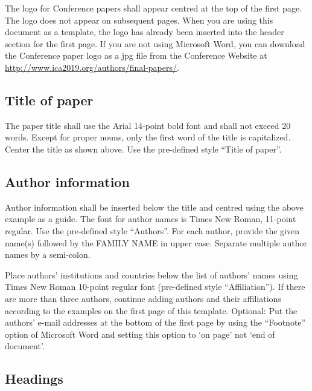The logo for Conference papers shall appear centred at the top of the first page. The logo does not appear on subsequent pages. When you are using this document as a template, the logo has already been inserted into the header section for the first page. If you are not using Microsoft Word, you can download the Conference paper logo as a jpg file from the Conference Website at \href{http://www.ica2019.org/authors/final-papers/}{http://www.ica2019.org/authors/final-papers/}.

\clearpage
\subsection{Title of paper}

The paper title shall use the Arial 14-point bold font and shall not exceed 20 words. Except for proper nouns, only the first word of the title is capitalized. Center the title as shown above. Use the pre-defined style ``Title of paper''.

\subsection{Author information}

Author information shall be inserted below the title and centred using the above example as a guide. The font for author names is Times New Roman, 11-point regular. Use the pre-defined style ``Authors''. For each author, provide the given name(s) followed by the FAMILY NAME in upper case. Separate multiple author names by a semi-colon.

Place authors' institutions and countries below the list of authors' names using Times New Roman 10-point regular font (pre-defined style ``Affiliation''). If there are more than three authors, continue adding authors and their affiliations according to the examples on the first page of this template.
Optional: Put the authors' e-mail addresses at the bottom of the first page by using the ``Footnote'' option of Microsoft Word and setting this option to `on page' not `end of document'.

\subsection{Headings}

